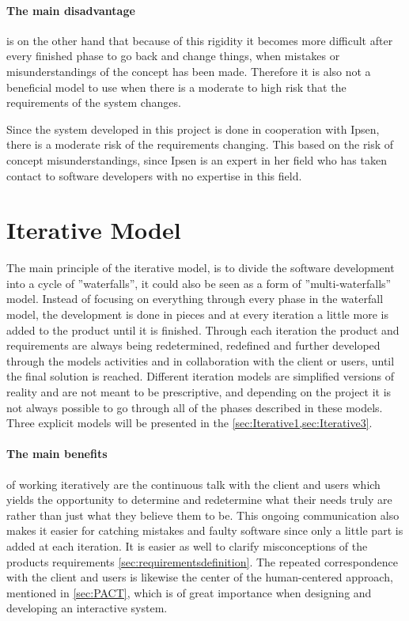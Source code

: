 \paragraph{The main disadvantage} is on the other hand that because of this rigidity it becomes more difficult after every finished phase to go back and change things, when mistakes or misunderstandings of the concept has been made.
Therefore it is also not a beneficial model to use when there is a moderate to high risk that the requirements of the system changes.

Since the system developed in this project is done in cooperation with Ipsen, there is a moderate risk of the requirements changing.
This based on the risk of concept misunderstandings, since Ipsen is an expert in her field who has taken contact to software developers with no expertise in this field.

\section{Iterative Model} \label{sec:iterativModel}
The main principle of the iterative model, \cite{Iterative-Toolsqa,InteractionDesign} is to divide the software development into a cycle of ''waterfalls'', it could also be seen as a form of ''multi-waterfalls'' model.
Instead of focusing on everything through every phase in the waterfall model, the development is done in pieces and at every iteration a little more is added to the product until it is finished.
Through each iteration the product and requirements are always being redetermined, redefined and further developed through the models activities and in collaboration with the client or users, until the final solution is reached.
Different iteration models are simplified versions of reality and are not meant to be prescriptive, and depending on the project it is not always possible to go through all of the phases described in these models.
Three explicit models will be presented in the \cref{sec:Iterative1,sec:Iterative3}.


\paragraph{The main benefits}
of working iteratively are the continuous talk with the client and users which yields the opportunity to determine and redetermine what their needs truly are rather than just what they believe them to be.
This ongoing communication also makes it easier for catching mistakes and faulty software since only a little part is added at each iteration.
It is easier as well to clarify misconceptions of the products requirements \cref{sec:requirementsdefinition}.
The repeated correspondence with the client and users is likewise the center of the human-centered approach, mentioned in \cref{sec:PACT}, which is of great importance when designing and developing an interactive system.

